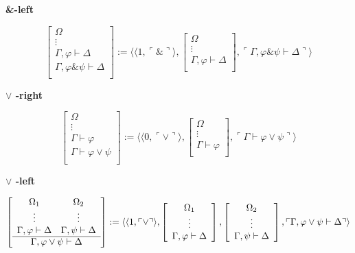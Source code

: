 \vspace{0,5cm}

\textbf{\&-left}

$$
\left [
\begin{array}{c}
\Omega\\
\vdots\\
\Gamma, \varphi \vdash \Delta\\
\hline
\Gamma, \varphi \& \psi \vdash \Delta\\
\end{array}
\right ]
:= \langle \langle 1,\ulcorner \& \urcorner \rangle ,
\left [
\begin{array}{c}
\Omega\\
\vdots\\
\Gamma, \varphi \vdash \Delta\\
\end{array}
\right ],
\ulcorner \Gamma, \varphi \& \psi \vdash \Delta \urcorner \rangle
$$

\vspace{0.5cm}

\textbf{$\vee$ -right}

$$
\left [
\begin{array}{c}
\Omega\\
\vdots\\
\Gamma \vdash \varphi\\
\hline
\Gamma \vdash \varphi \vee \psi\\
\end{array}
\right ]
:= \langle \langle 0,\ulcorner \vee \urcorner \rangle ,
\left [
\begin{array}{c}
\Omega\\
\vdots\\
\Gamma \vdash \varphi\\
\end{array}
\right ],
\ulcorner \Gamma \vdash \varphi \vee \psi \urcorner \rangle
$$

\vspace{0.5cm}

\textbf{$\vee$ -left}

{\tiny
$$
\left [
\begin{array}{cc}
\Omega_1 & \Omega_{2} \\
\vdots & \vdots\\
\Gamma, \varphi \vdash \Delta & \Gamma, \psi \vdash \Delta\\
\hline
\multicolumn{2}{c}{\Gamma, \varphi \vee \psi \vdash \Delta}\\
\end{array}
\right ]
:= \langle \langle 1,\ulcorner \vee \urcorner \rangle ,
\left [
\begin{array}{c}
\Omega_1\\
\vdots\\
\Gamma,\varphi \vdash \Delta\\
\end{array}
\right ],
\left [
\begin{array}{c}
\Omega_2\\
\vdots\\
\Gamma, \psi \vdash \Delta\\
\end{array}
\right],
\ulcorner \Gamma, \varphi \vee \psi \vdash \Delta \urcorner \rangle
$$}

